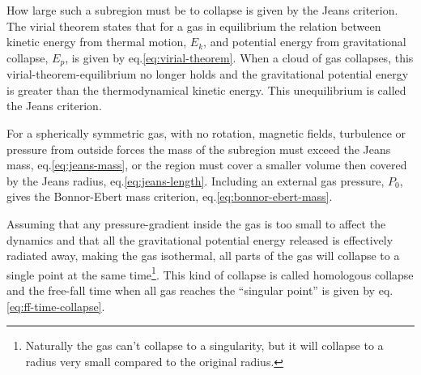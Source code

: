\noindent
\begin{minipage}{\textwidth}
  How large such a subregion must be to collapse is given by the Jeans criterion.
  The virial theorem states that for a gas in equilibrium the relation between kinetic energy from thermal motion, $E_k$, and potential energy from gravitational collapse, $E_p$, is given by eq.\ref{eq:virial-theorem}.
  When a cloud of gas collapses, this virial-theorem-equilibrium no longer holds and the gravitational potential energy is greater than the thermodynamical kinetic energy.
  This unequilibrium is called the Jeans criterion.

  For a spherically symmetric gas, with no rotation, magnetic fields, turbulence or pressure from outside forces the mass of the subregion must exceed the Jeans mass, eq.\ref{eq:jeans-mass}, or the region must cover a smaller volume then covered by the Jeans radius, eq.\ref{eq:jeans-length}.
  Including an external gas pressure, $P_0$, gives the Bonnor-Ebert mass criterion, eq.\ref{eq:bonnor-ebert-mass}.
  
  Assuming that any pressure-gradient inside the gas is too small to affect the dynamics and that all the gravitational potential energy released is effectively radiated away, making the gas isothermal, all parts of the gas will collapse to a single point at the same time\footnote{Naturally the gas can't collapse to a singularity, but it will collapse to a radius very small compared to the original radius.}.
  This kind of collapse is called homologous collapse and the free-fall time when all gas reaches the ``singular point'' is given by eq.\ref{eq:ff-time-collapse}.

\end{minipage}
